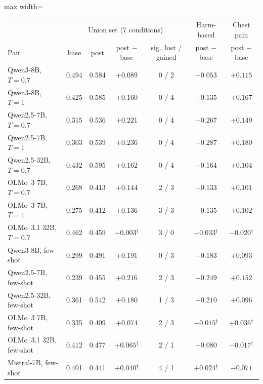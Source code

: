\documentclass[wcp]{jmlr}
\begin{document}
\begin{table}[t]
\centering\small
\begin{adjustbox}{max width=\linewidth}
\begin{tabular}{lcccccc}
\toprule
 & \multicolumn{4}{c}{Union set (7 conditions)} & Harm-based & Chest pain \\
Pair & base & post & post $-$ base & sig.\ lost / gained & post $-$ base & post $-$ base \\
\midrule
Qwen3-8B, $T{=}0.7$ & 0.494 & 0.584 & $+0.089$ & 0 / 2 & $+0.053$ & $+0.115$ \\
Qwen3-8B, $T{=}1$ & 0.425 & 0.585 & $+0.160$ & 0 / 4 & $+0.135$ & $+0.167$ \\
Qwen2.5-7B, $T{=}0.7$ & 0.315 & 0.536 & $+0.221$ & 0 / 4 & $+0.267$ & $+0.149$ \\
Qwen2.5-7B, $T{=}1$ & 0.303 & 0.539 & $+0.236$ & 0 / 4 & $+0.287$ & $+0.180$ \\
Qwen2.5-32B, $T{=}0.7$ & 0.432 & 0.595 & $+0.162$ & 0 / 4 & $+0.164$ & $+0.104$ \\
OLMo~3 7B, $T{=}0.7$ & 0.268 & 0.413 & $+0.144$ & 2 / 3 & $+0.133$ & $+0.101$ \\
OLMo~3 7B, $T{=}1$ & 0.275 & 0.412 & $+0.136$ & 3 / 3 & $+0.135$ & $+0.102$ \\
OLMo~3.1 32B, $T{=}0.7$ & 0.462 & 0.459 & $-0.003$$^{\dagger}$ & 3 / 0 & $-0.033$$^{\dagger}$ & $-0.020$$^{\dagger}$ \\
\midrule
Qwen3-8B, few-shot & 0.299 & 0.491 & $+0.191$ & 0 / 3 & $+0.183$ & $+0.093$ \\
Qwen2.5-7B, few-shot & 0.239 & 0.455 & $+0.216$ & 2 / 3 & $+0.249$ & $+0.152$ \\
Qwen2.5-32B, few-shot & 0.361 & 0.542 & $+0.180$ & 1 / 3 & $+0.210$ & $+0.096$ \\
OLMo~3 7B, few-shot & 0.335 & 0.409 & $+0.074$ & 2 / 3 & $-0.015$$^{\dagger}$ & $+0.036$$^{\dagger}$ \\
OLMo~3.1 32B, few-shot & 0.412 & 0.477 & $+0.065$$^{\dagger}$ & 2 / 1 & $+0.080$ & $-0.017$$^{\dagger}$ \\
Mistral-7B, few-shot & 0.401 & 0.441 & $+0.040$$^{\dagger}$ & 4 / 1 & $+0.024$$^{\dagger}$ & $-0.071$ \\
\bottomrule
\end{tabular}
\end{adjustbox}


\end{table}
\end{document}
